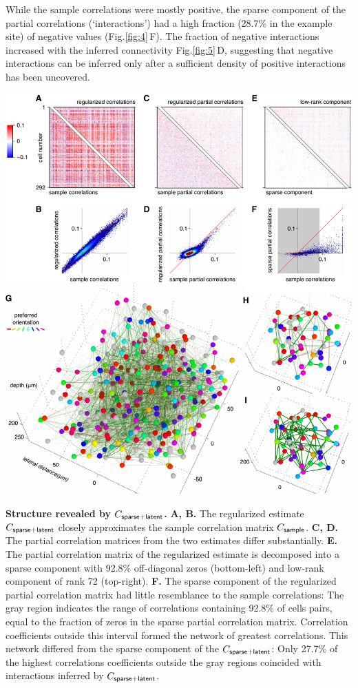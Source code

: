 \documentclass[10pt]{article}
\newcommand{\sq}[1]{\lq#1\rq}
\newcommand{\figref}[2]{Fig.\;\ref{fig:#1}\,#2}
\begin{document}
While the sample correlations were mostly positive, the sparse component of the partial correlations (\sq{interactions}) had a high fraction (28.7\% in the example site) of negative values (\figref{4}{F}). The fraction of negative interactions increased with the inferred connectivity \figref{5}{D}, suggesting that negative interactions can be inferred only after a sufficient density of positive interactions has been uncovered.

\begin{FPfigure}
    \begin{center}
        \includegraphics[width=17.35cm]{./figures/Figure04.pdf}
    \end{center}
    \caption{{\bf Structure revealed by $C_{\sf sparse+latent}$.}
    {\bf A, B.} The regularized estimate $C_{\sf sparse+latent}$ closely approximates the sample correlation matrix $C_{\sf sample}$. 
    {\bf C, D.} The partial correlation matrices from the two estimates differ substantially.
    {\bf E.} The partial correlation matrix of the regularized estimate is decomposed into a sparse component with 92.8\% off-diagonal zeros (bottom-left) and low-rank component of rank 72 (top-right).
    {\bf F.} The sparse component of the regularized partial correlation matrix had little resemblance to the sample correlations: The gray region indicates the range of correlations containing 92.8\% of cells pairs, equal to the fraction of zeros in the sparse partial correlation matrix. Correlation coefficients outside this interval formed the network of greatest correlations.  This network differed from the sparse component of the $C_{\sf sparse+latent}$:  Only 27.7\% of the highest correlations coefficients outside the gray regions coincided with interactions inferred by $C_{\sf sparse+latent}$.
}
\end{FPfigure}
\end{document}
